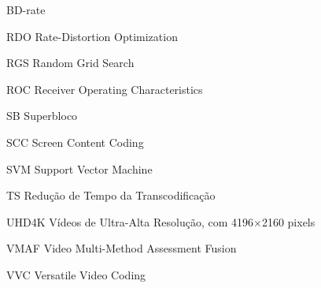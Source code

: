 \documentclass[tese,capa]{texufpel}
\begin{document}
\begin{listofabbrv}{BD-rate}
        \item[RDO] Rate-Distortion Optimization 
        \item[RGS] Random Grid Search
        \item[ROC] Receiver Operating Characteristics
        \item[SB] Superbloco
        \item[SCC] Screen Content Coding
        \item[SVM] Support Vector Machine
        \item[TS] Redução de Tempo da Transcodificação
        \item[UHD4K] Vídeos de Ultra-Alta Resolução, com 4196$\times$2160 pixels
        \item[VMAF] Video Multi-Method Assessment Fusion
        \item[VVC] Versatile Video Coding
\end{listofabbrv}

\tableofcontents











 

\apendices




\end{document}
